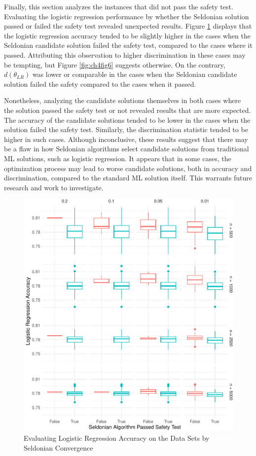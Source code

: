 \documentclass[12pt, twoside]{amherstthesis}
\begin{document}
Finally, this section analyzes the instances that did not pass the safety test. Evaluating the logistic regression performance by whether the Seldonian solution passed or failed the safety test revealed unexpected results. Figure \ref{fig:ch4fig5} displays that the logistic regression accuracy tended to be slightly higher in the cases when the Seldonian candidate solution failed the safety test, compared to the cases where it passed. Attributing this observation to higher discrimination in these cases may be tempting, but Figure \ref{fig:ch4fig6} suggests otherwise. On the contrary, \(d(\theta_{LR})\) was lower or comparable in the cases when the Seldonian candidate solution failed the safety compared to the cases when it passed.

Nonetheless, analyzing the candidate solutions themselves in both cases where the solution passed the safety test or not revealed results that are more expected. The accuracy of the candidate solutions tended to be lower in the cases when the solution failed the safety test. Similarly, the discrimination statistic tended to be higher in such cases. Although inconclusive, these results suggest that there may be a flaw in how Seldonian algorithms select candidate solutions from traditional ML solutions, such as logistic regression. It appears that in some cases, the optimization process may lead to worse candidate solutions, both in accuracy and discrimination, compared to the standard ML solution itself. This warrants future research and work to investigate.
\begin{figure}

{\centering \includegraphics{Dasha-Asienga_StatThesis_files/figure-latex/ch4fig5-1} 

}

\caption{Evaluating Logistic Regression Accuracy on the Data Sets by Seldonian Convergence}\label{fig:ch4fig5}
\end{figure}
\end{document}
